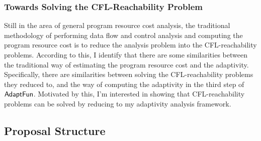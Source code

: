 \subsubsection{Towards Solving the CFL-Reachability Problem}
\label{subsec:intro-cfl}
Still in the area of general program resource cost analysis,
the traditional methodology of performing data flow and control analysis and 
computing the program resource cost is
to reduce the analysis problem into the CFL-reachability problems.
According to this, 
I identify 
that there are some similarities between the traditional way of estimating the program resource cost and 
the adaptivity.
Specifically, there are similarities between solving the CFL-reachability problems they reduced to,
 and the way of computing the adaptivity in 
the third step of $\textsf{AdaptFun}$.
 Motivated by this, 
 I'm interested in showing that
 CFL-reachability problems can be solved by reducing to my adaptivity analysis framework.


\subsection{Proposal Structure}
\label{subsec:intro-structure}


